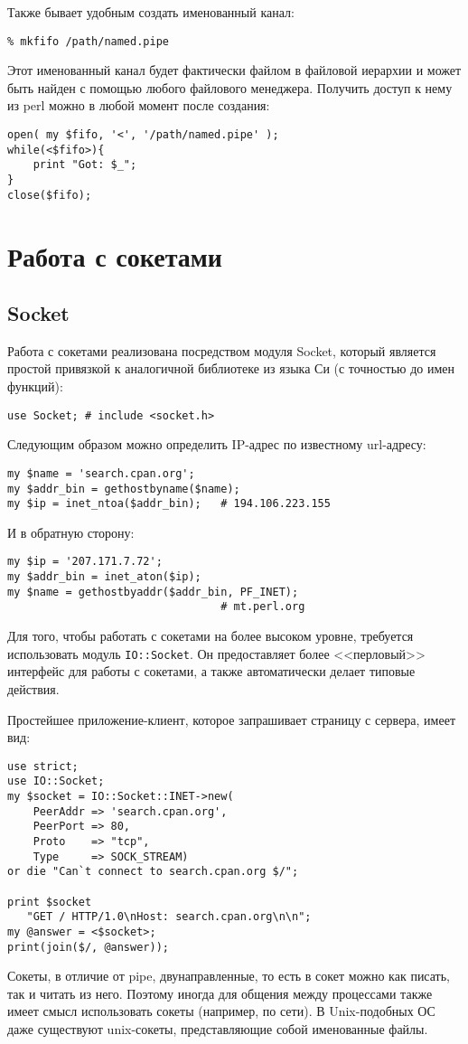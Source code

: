 Также бывает удобным создать именованный канал:
\begin{verbatim}
% mkfifo /path/named.pipe
\end{verbatim}
Этот именованный канал будет фактически файлом в файловой иерархии и может быть найден с помощью любого файлового менеджера. Получить доступ к нему из perl можно в любой момент после создания:
\begin{verbatim}
open( my $fifo, '<', '/path/named.pipe' );
while(<$fifo>){
    print "Got: $_";
}
close($fifo);
\end{verbatim}


\section{Работа с сокетами}
\subsection{Socket}
Работа с сокетами реализована посредством модуля Socket, который является простой привязкой к аналогичной библиотеке из языка Си (с точностью до имен функций):
\begin{verbatim}
use Socket; # include <socket.h>
\end{verbatim}
Следующим образом можно определить IP-адрес по известному url-адресу:
\begin{verbatim}
my $name = 'search.cpan.org';
my $addr_bin = gethostbyname($name);
my $ip = inet_ntoa($addr_bin);   # 194.106.223.155
\end{verbatim}
И в обратную сторону:
\begin{verbatim}
my $ip = '207.171.7.72';
my $addr_bin = inet_aton($ip);
my $name = gethostbyaddr($addr_bin, PF_INET);
                                 # mt.perl.org
\end{verbatim}
Для того, чтобы работать с сокетами на более высоком уровне, требуется использовать модуль \verb|IO::Socket|. Он предоставляет более <<перловый>> интерфейс для работы с сокетами, а также автоматически делает типовые действия.

Простейшее приложение-клиент, которое запрашивает страницу с сервера, имеет вид:
\begin{verbatim}
use strict;
use IO::Socket;
my $socket = IO::Socket::INET->new(
    PeerAddr => 'search.cpan.org',
    PeerPort => 80,
    Proto    => "tcp",
    Type     => SOCK_STREAM)
or die "Can`t connect to search.cpan.org $/";

print $socket
   "GET / HTTP/1.0\nHost: search.cpan.org\n\n";
my @answer = <$socket>;
print(join($/, @answer));
\end{verbatim}
Сокеты, в отличие от pipe, двунаправленные, то есть в сокет можно как писать, так и читать из него. Поэтому иногда для общения между процессами также имеет смысл использовать сокеты (например, по сети). В Unix-подобных ОС даже существуют unix-сокеты, представляющие собой именованные файлы.

